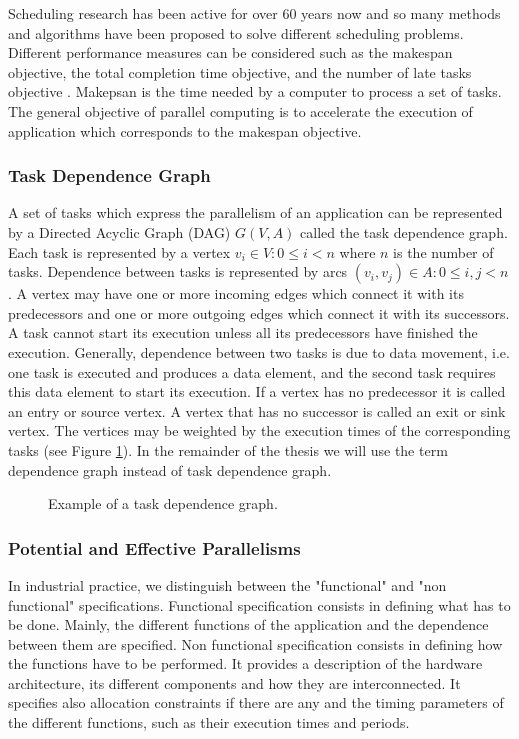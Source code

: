 Scheduling research has been active for over 60 years now and so many methods and algorithms have been proposed to solve different scheduling problems. Different performance measures can be considered such as the makespan objective, the total completion time objective, and the number of late tasks objective \cite{leung:2004}. Makepsan is the time needed by a computer to process a set of tasks. The general objective of parallel computing is to accelerate the execution of application which corresponds to the makespan objective.

\subsubsection{Task Dependence Graph}

A set of tasks which express the parallelism of an application can be represented by a Directed Acyclic Graph (DAG) $G(V,A)$ called the task dependence graph. Each task is represented by a vertex $v_i \in V: 0 \leq i < n$ where $n$ is the number of tasks. Dependence between tasks is represented by arcs $(v_i, v_j) \in A: 0 \leq i,j < n$. A vertex may have one or more incoming edges which connect it with its predecessors and one or more outgoing edges which connect it with its successors. A task cannot start its execution unless all its predecessors have finished the execution. Generally, dependence between two tasks is due to data movement, i.e. one task is executed and produces a data element, and the second task requires this data element to start its execution. If a vertex has no predecessor it is called an entry or source vertex. A vertex that has no successor is called an exit or sink vertex. The vertices may be weighted by the execution times of the corresponding tasks (see Figure \ref{fig:dagex}). In the remainder of the thesis we will use the term dependence graph instead of task dependence graph.

\begin{figure}[phbt]
\centering

\caption{Example of a task dependence graph.}
\label{fig:dagex}
\end{figure} 

\subsubsection{Potential and Effective Parallelisms}

In industrial practice, we distinguish between the "functional" and "non functional" specifications. Functional specification consists in defining what has to be done. Mainly, the different functions of the application and the dependence between them are specified. Non functional specification consists in defining how the functions have to be performed. It provides a description of the hardware architecture, its different components and how they are interconnected. It specifies also allocation constraints if there are any and the timing parameters of the different functions, such as their execution times and periods.

